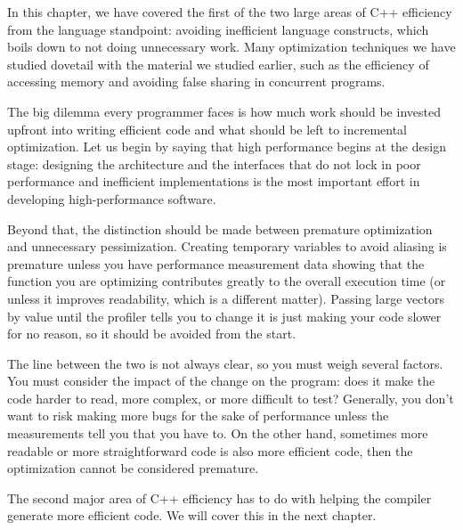 In this chapter, we have covered the first of the two large areas of C++ efficiency from the language standpoint: avoiding inefficient language constructs, which boils down to not doing unnecessary work. Many optimization techniques we have studied dovetail with the material we studied earlier, such as the efficiency of accessing memory and avoiding false sharing in concurrent programs. 

The big dilemma every programmer faces is how much work should be invested upfront into writing efficient code and what should be left to incremental optimization. Let us begin by saying that high performance begins at the design stage: designing the architecture and the interfaces that do not lock in poor performance and inefficient implementations is the most important effort in developing high-performance software. 

Beyond that, the distinction should be made between premature optimization and unnecessary pessimization. Creating temporary variables to avoid aliasing is premature unless you have performance measurement data showing that the function you are optimizing contributes greatly to the overall execution time (or unless it improves readability, which is a different matter). Passing large vectors by value until the profiler tells you to change it is just making your code slower for no reason, so it should be avoided from the start. 

The line between the two is not always clear, so you must weigh several factors. You must consider the impact of the change on the program: does it make the code harder to read, more complex, or more difficult to test? Generally, you don’t want to risk making more bugs for the sake of performance unless the measurements tell you that you have to. On the other hand, sometimes more readable or more straightforward code is also more efficient code, then the optimization cannot be considered premature. 

The second major area of C++ efficiency has to do with helping the compiler generate more efficient code. We will cover this in the next chapter.